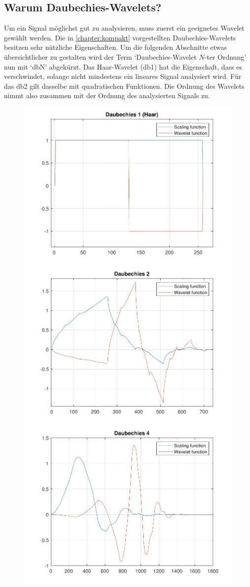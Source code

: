\begin{refsection}
\section{Warum Daubechies-Wavelets?}
%
\label{chapter:daubechies}
Um ein Signal möglichst gut zu analysieren, muss zuerst ein geeignetes Wavelet gewählt werden.
Die in \autoref{chapter:kompakt} vorgestellten Daubechies-Wavelets besitzen sehr nützliche Eigenschaften.
Um die folgenden Abschnitte etwas übersichtlicher zu gestalten wird der Term `Daubechies-Wavelet $N$-ter Ordnung' nun mit `dbN' abgekürzt.
Das Haar-Wavelet (db1) hat die Eigenschaft, dass es verschwindet, solange nicht mindestens ein lineares Signal analysiert wird.
%
Für das db2 gilt dasselbe mit quadratischen Funktionen. 
Die Ordnung des Wavelets nimmt also zusammen mit der Ordnung des analysierten Signals zu.
\begin{figure}
	\includegraphics[width=0.5\linewidth]{papers/compress/Bilder/db1}
	\includegraphics[width=0.5\linewidth]{papers/compress/Bilder/db2}
	\includegraphics[width=0.5\linewidth]{papers/compress/Bilder/db4}

\end{figure}
\end{refsection}
